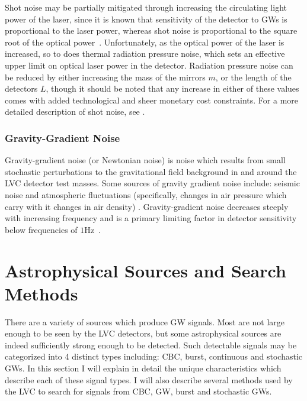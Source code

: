 %
%
Shot noise may be partially mitigated 
through increasing the circulating light power of the laser, since it is 
known that sensitivity of the detector to \ac{GW}s is proportional to the 
laser power, whereas shot noise is proportional to the square root of the 
optical power~\cite{Abadie2011}. Unfortunately, as 
the optical power of the laser is 
increased, so to does thermal radiation pressure noise, which sets 
an effective upper limit on optical laser power in the 
detector. Radiation pressure noise can be reduced by either increasing 
the mass of the mirrors $m$, or the length of the detectors $L$, though 
it should be noted that any increase in either of these values comes 
with added technological and sheer monetary cost constraints.
For a more detailed description of shot noise, see \cite{Hild2014}.

\subsubsection{Gravity-Gradient Noise}

Gravity-gradient noise (or Newtonian noise) is 
noise which results from small stochastic 
perturbations to the gravitational field background in and around 
the \ac{LVC} detector test masses. Some sources of gravity gradient noise 
include: seismic noise and atmospheric fluctuations 
(specifically, changes in air pressure which 
carry with it changes in air density)
\cite{PhysRevD.58.122002}. Gravity-gradient noise decreases steeply with 
increasing frequency and is a primary limiting factor in detector 
sensitivity below frequencies of $1$Hz~\cite{Sathyaprakash2009}.

\section{Astrophysical Sources and Search Methods}\label{sec:sources_methods}

There are a variety of sources which produce 
\ac{GW} signals. Most are not large enough to be seen by the 
\ac{LVC} detectors, but some astrophysical sources 
are indeed sufficiently strong enough 
to be detected. Such detectable signals may be categorized into 4 
distinct types including: \ac{CBC}, burst,
continuous and 
stochastic \ac{GW}s. In this 
section I will explain in detail the unique characteristics which 
describe each of these signal types. I will also 
describe several methods used by the 
\ac{LVC} to search for signals from \ac{CBC}, \ac{GW}, burst and 
stochastic \ac{GW}s.

